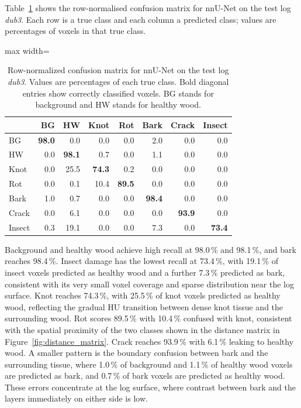 Table~\ref{tab:cmnnunet} shows the row-normalised confusion matrix for nnU-Net on the test log \textit{dub3}. Each row is a true class and each column a predicted class; values are percentages of voxels in that true class.

\begin{table}[H]
    \centering
    \caption{Row-normalized confusion matrix for nnU-Net on the test log \textit{dub3}. Values are percentages of each true class. Bold diagonal entries show correctly classified voxels. BG stands for background and HW stands for healthy wood.}
    \label{tab:cmnnunet}
    \begin{adjustbox}{max width=\textwidth}
    \begin{tabular}{lrrrrrrr}
        \toprule
        & \textbf{BG} & \textbf{HW} & \textbf{Knot} & \textbf{Rot} & \textbf{Bark} & \textbf{Crack} & \textbf{Insect} \\
        \midrule
        BG     & \textbf{98.0} &  0.0 &  0.0 &  0.0 &  2.0 & 0.0 & 0.0 \\
        HW     &  0.0 & \textbf{98.1} &  0.7 &  0.0 &  1.1 & 0.0 & 0.0 \\
        Knot   &  0.0 & 25.5 & \textbf{74.3} &  0.2 &  0.0 & 0.0 & 0.0 \\
        Rot    &  0.0 &  0.1 & 10.4 & \textbf{89.5} &  0.0 & 0.0 & 0.0 \\
        Bark   &  1.0 &  0.7 &  0.0 &  0.0 & \textbf{98.4} & 0.0 & 0.0 \\
        Crack  &  0.0 &  6.1 &  0.0 &  0.0 &  0.0 & \textbf{93.9} & 0.0 \\
        Insect &  0.3 & 19.1 &  0.0 &  0.0 &  7.3 & 0.0 & \textbf{73.4} \\
        \bottomrule
    \end{tabular}
    \end{adjustbox}
\end{table}

Background and healthy wood achieve high recall at 98.0\,\% and 98.1\,\%, and bark reaches 98.4\,\%. Insect damage has the lowest recall at 73.4\,\%, with 19.1\,\% of insect voxels predicted as healthy wood and a further 7.3\,\% predicted as bark, consistent with its very small voxel coverage and sparse distribution near the log surface. Knot reaches 74.3\,\%, with 25.5\,\% of knot voxels predicted as healthy wood, reflecting the gradual HU transition between dense knot tissue and the surrounding wood. Rot scores 89.5\,\% with 10.4\,\% confused with knot, consistent with the spatial proximity of the two classes shown in the distance matrix in Figure~\ref{fig:distance_matrix}. Crack reaches 93.9\,\% with 6.1\,\% leaking to healthy wood. A smaller pattern is the boundary confusion between bark and the surrounding tissue, where 1.0\,\% of background and 1.1\,\% of healthy wood voxels are predicted as bark, and 0.7\,\% of bark voxels are predicted as healthy wood. These errors concentrate at the log surface, where contrast between bark and the layers immediately on either side is low.



